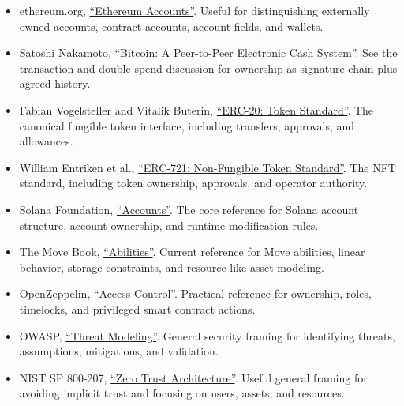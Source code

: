 \begin{itemize}
\tightlist
\item
  ethereum.org,
  \href{https://ethereum.org/developers/docs/accounts/}{``Ethereum
  Accounts''}. Useful for distinguishing externally owned accounts,
  contract accounts, account fields, and wallets.
\item
  Satoshi Nakamoto, \href{https://bitcoin.org/bitcoin.pdf}{``Bitcoin: A
  Peer-to-Peer Electronic Cash System''}. See the transaction and
  double-spend discussion for ownership as signature chain plus agreed
  history.
\item
  Fabian Vogelsteller and Vitalik Buterin,
  \href{https://eips.ethereum.org/EIPS/eip-20}{``ERC-20: Token
  Standard''}. The canonical fungible token interface, including
  transfers, approvals, and allowances.
\item
  William Entriken et al.,
  \href{https://eips.ethereum.org/EIPS/eip-721}{``ERC-721: Non-Fungible
  Token Standard''}. The NFT standard, including token ownership,
  approvals, and operator authority.
\item
  Solana Foundation,
  \href{https://solana.com/docs/core/accounts}{``Accounts''}. The core
  reference for Solana account structure, account ownership, and runtime
  modification rules.
\item
  The Move Book,
  \href{https://move-book.com/reference/abilities/}{``Abilities''}.
  Current reference for Move abilities, linear behavior, storage
  constraints, and resource-like asset modeling.
\item
  OpenZeppelin,
  \href{https://docs.openzeppelin.com/contracts/5.x/access-control}{``Access
  Control''}. Practical reference for ownership, roles, timelocks, and
  privileged smart contract actions.
\item
  OWASP, \href{https://owasp.org/www-community/Threat_Modeling}{``Threat
  Modeling''}. General security framing for identifying threats,
  assumptions, mitigations, and validation.
\item
  NIST SP 800-207,
  \href{https://csrc.nist.gov/pubs/sp/800/207/final}{``Zero Trust
  Architecture''}. Useful general framing for avoiding implicit trust
  and focusing on users, assets, and resources.
\end{itemize}
